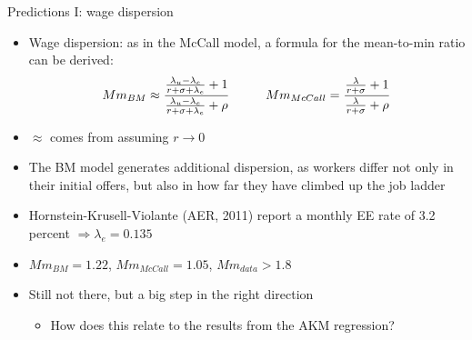\documentclass[9pt]{beamer}
\newcommand{\bit}{\begin{itemize}}
\newcommand{\eit}{\end{itemize}}
\newcommand{\bc}{\color{blue}}
\begin{document}
\begin{frame}{Predictions I: wage dispersion}

\bit
\setlength\itemsep{1.5em}

\item Wage dispersion: as in the McCall model, a formula for the mean-to-min ratio can be derived:
\begin{eqnarray}
Mm_{BM} \approx \frac{\frac{\lambda_u - \lambda_e}{r+\sigma+\lambda_e} +1}{\frac{\lambda_u-\lambda_e}{r+\sigma + \lambda_e}+\rho}   \hspace{10mm} Mm_{McCall} = \frac{\frac{\lambda}{r+\sigma}+1}{\frac{\lambda}{r+\sigma}+\rho} \nonumber
\end{eqnarray}
\item $\approx$ comes from assuming $r \rightarrow 0$

\item The BM model generates additional dispersion, as workers differ not only in their initial offers, but also in how far they have climbed up the job ladder

\item Hornstein-Krusell-Violante (AER, 2011) report a monthly EE rate of 3.2 percent $\Rightarrow \lambda_e = 0.135$

\item {\bc$Mm_{BM} = 1.22$}, $Mm_{McCall} = 1.05$, $Mm_{data} > 1.8$

\item Still not there, but a big step in the right direction
\bit
	\item How does this relate to the results from the AKM regression?
\eit

\eit


\end{frame}
\end{document}
